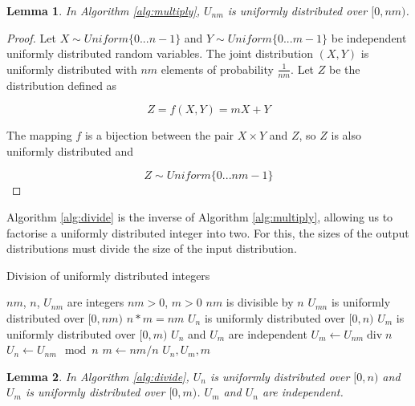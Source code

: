 \documentclass[12pt]{article}
\newtheorem{lemma}{Lemma}
\begin{document}
\begin{lemma}
In Algorithm \ref{alg:multiply}, $U_{nm}$ is uniformly distributed over $[0,nm)$.
\end{lemma}

\begin{proof}
Let $X \sim Uniform \{0 ... n-1\}$ and $Y \sim Uniform\{0 ... m-1\}$ be independent uniformly distributed random variables. The joint distribution $(X,Y)$ is uniformly distributed with $nm$ elements of probability $\frac{1}{nm}$. Let $Z$ be the distribution defined as

\begin{equation}
Z = f(X,Y) = mX+Y
\end{equation}

The mapping $f$ is a bijection between the pair $X \times Y$ and $Z$, so $Z$ is also uniformly distributed and 

\begin{equation}
Z \sim Uniform \{0 ... nm-1\}
\end{equation}
\end{proof}

Algorithm \ref{alg:divide} is the inverse of Algorithm \ref{alg:multiply}, allowing us to factorise a uniformly distributed integer into two. For this, the sizes of the output distributions must divide the size of the input distribution.

\begin{algorithm}
\caption{Division of uniformly distributed integers}
\label{alg:divide}
\begin{algorithmic}[1]
    \Require $nm$, $n$, $U_{nm}$ are integers
    \Require $nm>0$, $m>0$
    \Require $nm$ is divisible by $n$
    \Require $U_{mn}$ is uniformly distributed over $[0,nm)$
    \Ensure $n * m = nm$
    \Ensure $U_{n}$ is uniformly distributed over $[0,n)$
    \Ensure $U_{m}$ is uniformly distributed over $[0,m)$
    \Ensure $U_n$ and $U_m$ are independent
  \State $U_m \gets U_{nm} \operatorname{div} n$
  \State $U_{n} \gets U_{nm} \mod n$
  \State $m \gets nm / n$
  \State \Return $U_n, U_m, m$
\EndProcedure
\end{algorithmic}
\end{algorithm}

\begin{lemma}
In Algorithm \ref{alg:divide}, $U_n$ is uniformly distributed over $[0,n)$ and $U_m$ is uniformly distributed over $[0,m)$. $U_m$ and $U_n$ are independent.
\end{lemma}
\end{document}
